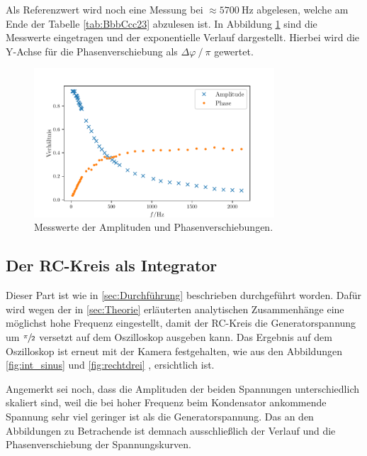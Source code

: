 \FloatBarrier

Als Referenzwert wird noch eine Messung bei $\approx \SI{5700}{\hertz}$ abgelesen, welche am Ende der Tabelle \ref{tab:BbbCcc23} abzulesen ist.
In Abbildung \ref{fig:mess_b_c} sind die Messwerte eingetragen und der exponentielle Verlauf dargestellt.
Hierbei wird die Y-Achse für die Phasenverschiebung als $\Delta\varphi\:/\:\pi$ gewertet.

\begin{figure}
    \centering
    \includegraphics[width=0.8\textwidth]{plots/plot_b_c.pdf}
    \caption{Messwerte der Amplituden und Phasenverschiebungen.}
    \label{fig:mess_b_c}
\end{figure}

\subsection{Der RC-Kreis als Integrator}

Dieser Part ist wie in \ref{sec:Durchführung} beschrieben durchgeführt worden. 
Dafür wird wegen der in \ref{sec:Theorie} erläuterten analytischen Zusammenhänge eine möglichst hohe Frequenz eingestellt, 
damit der RC-Kreis die Generatorspannung um $\sfrac{\pi}{2}$ versetzt auf dem Oszilloskop ausgeben kann. 
Das Ergebnis auf dem Oszilloskop ist erneut mit der Kamera festgehalten, wie aus den Abbildungen \ref{fig:int_sinus} und 
\ref{fig:rechtdrei} ,  ersichtlich ist. 

Angemerkt sei noch, dass die Amplituden der beiden Spannungen unterschiedlich skaliert sind, weil die bei hoher Frequenz 
beim Kondensator ankommende Spannung sehr viel geringer ist als die Generatorspannung. 
Das an den Abbildungen zu Betrachende ist demnach ausschließlich der Verlauf und die Phasenverschiebung der Spannungskurven. 

